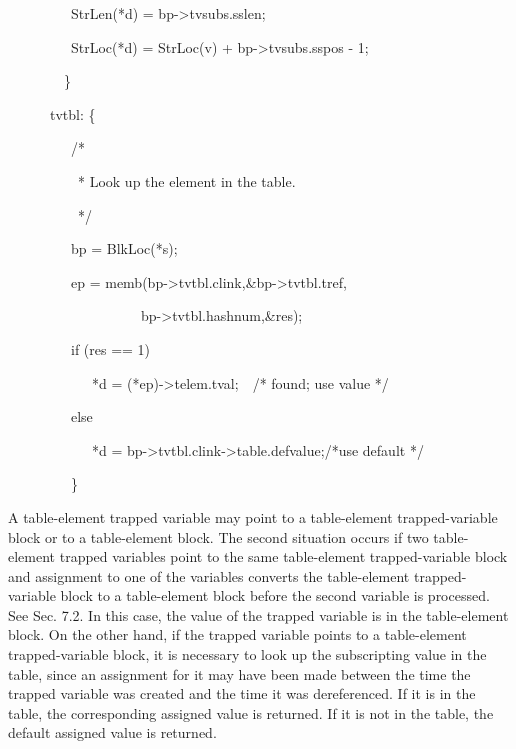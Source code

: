 {\ttfamily\mdseries
\ \ \ \ \ \ \ \ \ StrLen(*d) = bp-{\textgreater}tvsubs.sslen;}

{\ttfamily\mdseries
\ \ \ \ \ \ \ \ \ StrLoc(*d) = StrLoc(v) + bp-{\textgreater}tvsubs.sspos - 1;}

{\ttfamily\mdseries
\ \ \ \ \ \ \ \ \}}


\bigskip

{\ttfamily\mdseries
\ \ \ \ \ \ tvtbl: \{}

{\ttfamily\mdseries
\ \ \ \ \ \ \ \ \ /*}

{\ttfamily\mdseries
\ \ \ \ \ \ \ \ \ \ * Look up the element in the table.}

{\ttfamily\mdseries
\ \ \ \ \ \ \ \ \ \ */}

{\ttfamily\mdseries
\ \ \ \ \ \ \ \ \ bp = BlkLoc(*s);}

{\ttfamily\mdseries
\ \ \ \ \ \ \ \ \ ep = memb(bp-{\textgreater}tvtbl.clink,\&bp-{\textgreater}tvtbl.tref,}

{\ttfamily\mdseries
\ \ \ \ \ \ \ \ \ \ \ \ \ \ \ \ \ \ \ bp-{\textgreater}tvtbl.hashnum,\&res);}

{\ttfamily\mdseries
\ \ \ \ \ \ \ \ \ if (res == 1)}

{\ttfamily\mdseries
\ \ \ \ \ \ \ \ \ \ \ \ *d = (*ep)-{\textgreater}telem.tval;\ \ /* found; use value */}

{\ttfamily\mdseries
\ \ \ \ \ \ \ \ \ else}

{\ttfamily\mdseries
\ \ \ \ \ \ \ \ \ \ \ \ *d = bp-{\textgreater}tvtbl.clink-{\textgreater}table.defvalue;/*use default */}

{\ttfamily\mdseries
\ \ \ \ \ \ \ \ \ \}}


\bigskip

\bigskip

A table-element trapped variable may point to a table-element
trapped-variable block or to a table-element block. The second
situation occurs if two table-element trapped variables point to the
same table-element trapped-variable block and assignment to one of the
variables converts the table-element trapped-variable block to a
table-element block before the second variable is processed. See
Sec. 7.2. In this case, the value of the trapped variable is in the
table-element block. On the other hand, if the trapped variable points
to a table-element trapped-variable block, it is necessary to look up
the subscripting value in the table, since an assignment for it may
have been made between the time the trapped variable was created and
the time it was dereferenced. If it is in the table, the corresponding
assigned value is returned. If it is not in the table, the default
assigned value is returned.

